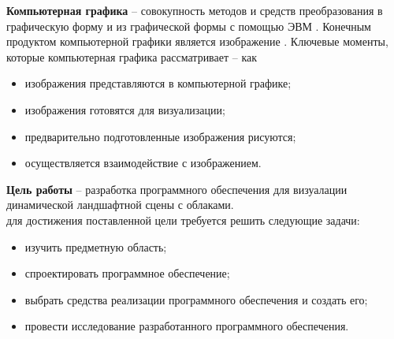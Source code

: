 \textbf{Компьютерная графика} -- совокупность методов и средств преобразования в графическую форму и из графической формы с помощью ЭВМ \cite{kurov2024lections}. Конечным продуктом компьютерной графики является изображение \cite{rodgers1989algorithms}. Ключевые моменты, которые компьютерная графика рассматривает -- как \cite{rodgers1989algorithms}
\begin{itemize}
	\item изображения представляются в компьютерной графике;
	\item изображения готовятся для визуализации;
	\item предварительно подготовленные изображения рисуются;
	\item осуществляется взаимодействие с изображением.
\end{itemize}
\textbf{Цель работы} -- разработка программного обеспечения для визуалации динамической ландшафтной сцены с облаками.\\
для достижения поставленной цели требуется решить следующие задачи:
\begin{itemize}
	\item изучить предметную область;
	\item спроектировать программное обеспечение;
	\item выбрать средства реализации программного обеспечения и создать его;
	\item провести исследование разработанного программного обеспечения.
\end{itemize}

